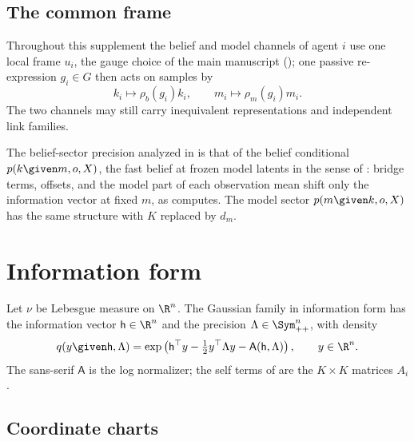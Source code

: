 \subsection{The common frame}
\label{sec:gen-gaussian-diagonal}

Throughout this supplement the belief and model channels of agent \(i\) use
one local frame \(u_i\), the gauge choice of the main manuscript
(); one passive re-expression \(g_i\in G\) then acts on
samples by
\begin{equation}
k_i\longmapsto\rho_b(g_i)k_i,
\qquad
m_i\longmapsto\rho_m(g_i)m_i.
\label{eq:gen-gaussian-diagonal-action}
\end{equation}
The two channels may still carry inequivalent representations and
independent link families.

The belief-sector precision analyzed in 
is that of the belief conditional \(p(k\given m,o,X)\), the fast belief at
frozen model latents in the sense of : bridge terms,
offsets, and the model part of each observation mean shift only the
information vector at fixed \(m\), as
 computes. The model sector
\(p(m\given k,o,X)\) has the same structure with \(K\) replaced by \(d_m\).

\section{Information form}
\label{sec:gauss-information-form}

Let \(\nu\) be Lebesgue measure on \(\R^n\). The Gaussian family in
information form has the information vector \(\mathsf h\in\R^n\) and the
precision \(\Lambda\in\Sym_{++}^n\), with density
\begin{equation}
q(y\given\mathsf h,\Lambda)
=\exp\left(\mathsf h^\top y-\tfrac12 y^\top\Lambda y-\mathsf A(\mathsf h,\Lambda)\right),
\qquad y\in\R^n.
\label{eq:gauss-density}
\end{equation}
The sans-serif \(\mathsf A\) is the log normalizer; the self terms of
 are the \(K\times K\) matrices \(A_i\).

\subsection{Coordinate charts}
\label{sec:ig-expfam}

